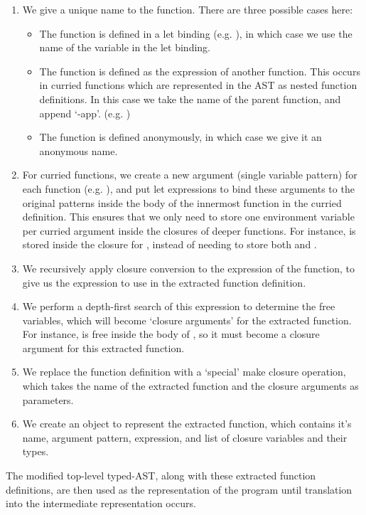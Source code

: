 \begin{enumerate}
\item We give a unique name to the function. There are three possible cases here:
\begin{itemize}
\item The function is defined in a let binding (e.g. ), in which case we use the name of the variable in the let binding.
\item The function is defined as the expression of another function. This occurs in curried functions which are represented in the AST as nested function definitions. In this case we take the name of the parent function, and append `-app'. (e.g. )
\item The function is defined anonymously, in which case we give it an anonymous name.
\end{itemize}
\item For curried functions, we create a new argument (single variable pattern) for each function (e.g. ), and put let expressions to bind these arguments to the original patterns inside the body of the innermost function in the curried definition. This ensures that we only need to store one environment variable per curried argument inside the closures of deeper functions. For instance,  is stored inside the closure for , instead of needing to store both  and .

\item We recursively apply closure conversion to the expression of the function, to give us the expression to use in the extracted function definition.
\item We perform a depth-first search of this expression to determine the free variables, which will become `closure arguments' for the extracted function. For instance,  is free inside the body of , so it must become a closure argument for this extracted function.
\item We replace the function definition with a `special' make closure operation, which takes the name of the extracted function and the closure arguments as parameters. 
\item We create an object to represent the extracted function, which contains it's name, argument pattern, expression, and list of closure variables and their types.
\end{enumerate}
The modified top-level typed-AST, along with these extracted function definitions, are then used as the representation of the program until translation into the intermediate representation occurs.





